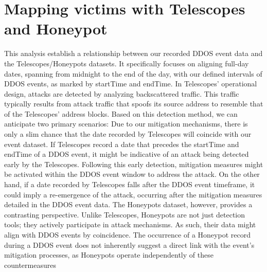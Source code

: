 \section{Mapping victims with Telescopes and Honeypot}\label{sec:mapping_victim}
This analysis establish a relationship between our recorded DDOS event data and the Telescopes/Honeypots datasets. It specifically focuses on aligning full-day dates, spanning from midnight to the end of the day, with our defined intervals of DDOS events, as marked by startTime and endTime. 
In Telescopes' operational design, attacks are detected by analyzing backscattered traffic. This traffic typically results from attack traffic that spoofs its source address to resemble that of the Telescopes' address blocks. Based on this detection method, we can anticipate two primary scenarios:
Due to our mitigation mechanisms, there is only a slim chance that the date recorded by Telescopes will coincide with our event dataset. If Telescopes record a date that precedes the startTime and endTime of a DDOS event, it might be indicative of an attack being detected early by the Telescopes. Following this early detection, mitigation measures might be activated within the DDOS event window to address the attack. On the other hand, if a date recorded by Telescopes falls after the DDOS event timeframe, it could imply a re-emergence of the attack, occurring after the mitigation measures detailed in the DDOS event data.
The Honeypots dataset, however, provides a contrasting perspective. Unlike Telescopes, Honeypots are not just detection tools; they actively participate in attack mechanisms. As such, their data might align with DDOS events by coincidence. The occurrence of a Honeypot record during a DDOS event does not inherently suggest a direct link with the event's mitigation processes, as Honeypots operate independently of these countermeasures

